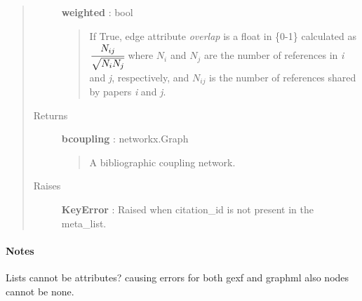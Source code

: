 \documentclass[letterpaper,10pt,english]{sphinxmanual}
\begin{document}
\begin{fulllineitems}
\begin{quote}
\begin{description}
\textbf{weighted} : bool
\begin{quote}

If True, edge attribute \emph{overlap} is a float in \{0-1\} calculated as
\(\cfrac{N_{ij}}{\sqrt{N_{i}N_{j}}}\) where \(N_{i}\) and
\(N_{j}\) are the number of references in {\hyperref[tethne.classes.paper:tethne.classes.paper.Paper]{}} \emph{i} and
\emph{j}, respectively, and \(N_{ij}\) is the number of references
shared by papers \emph{i} and \emph{j}.
\end{quote}

\item[{Returns}] \leavevmode
\textbf{bcoupling} : networkx.Graph
\begin{quote}

A bibliographic coupling network.
\end{quote}

\item[{Raises}] \leavevmode
\textbf{KeyError} : Raised when citation\_id is not present in the meta\_list.

\end{description}\end{quote}
\paragraph{Notes}

Lists cannot be attributes? causing errors for both gexf and graphml also
nodes cannot be none.

\end{fulllineitems}

\end{document}
